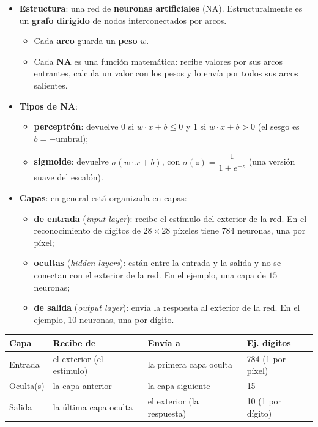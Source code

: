 \documentclass[11pt,a4paper]{article}
\begin{document}
\begin{itemize}
  \item \textbf{Estructura}: una red de \textbf{neuronas artificiales} (NA). Estructuralmente es un \textbf{grafo dirigido} de nodos interconectados por arcos.
  \begin{itemize}
    \item Cada \textbf{arco} guarda un \textbf{peso} $w$.
    \item Cada \textbf{NA} es una función matemática: recibe valores por sus arcos entrantes, calcula un valor con los pesos y lo envía por todos sus arcos salientes.
  \end{itemize}
  \item \textbf{Tipos de NA}:
  \begin{itemize}
    \item \textbf{perceptrón}: devuelve $0$ si $w \cdot x + b \le 0$ y $1$ si $w \cdot x + b > 0$ (el sesgo es $b = -\text{umbral}$);
    \item \textbf{sigmoide}: devuelve $\sigma(w \cdot x + b)$, con $\sigma(z) = \dfrac{1}{1+e^{-z}}$ (una versión suave del escalón).
  \end{itemize}
  \item \textbf{Capas}: en general está organizada en capas:
  \begin{itemize}
    \item \textbf{de entrada} (\textit{input layer}): recibe el estímulo del exterior de la red. En el reconocimiento de dígitos de $28 \times 28$ píxeles tiene $784$ neuronas, una por píxel;
    \item \textbf{ocultas} (\textit{hidden layers}): están entre la entrada y la salida y no se conectan con el exterior de la red. En el ejemplo, una capa de $15$ neuronas;
    \item \textbf{de salida} (\textit{output layer}): envía la respuesta al exterior de la red. En el ejemplo, $10$ neuronas, una por dígito.
  \end{itemize}
\end{itemize}

\begin{center}
\small
\begin{tabularx}{\linewidth}{@{}l X X l@{}}
\toprule
\textbf{Capa} & \textbf{Recibe de} & \textbf{Envía a} & \textbf{Ej. dígitos} \\
\midrule
Entrada & el exterior (el estímulo) & la primera capa oculta & 784 (1 por píxel) \\
Oculta(s) & la capa anterior & la capa siguiente & 15 \\
Salida & la última capa oculta & el exterior (la respuesta) & 10 (1 por dígito) \\
\bottomrule
\end{tabularx}
\end{center}
\end{document}
